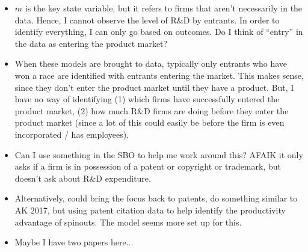 \documentclass[12pt,english]{article}
\theoremstyle{remark}
\begin{document}
\begin{itemize}
	\item $m$ is the key state variable, but it refers to firms that aren't necessarily in the data. Hence, I cannot observe the level of R\&D by entrants. In order to identify everything, I can only go based on outcomes. Do I think of ``entry'' in the data as entering the product market? 
	\item When these models are brought to data, typically only entrants who have won a race are identified with entrants entering the market. This makes sense, since they don't enter the product market until they have a product. But, I have no way of identifying (1) which firms have successfully entered the product market, (2) how much R\&D firms are doing before they enter the product market (since a lot of this could easily be before the firm is even incorporated / has employees). 
	\item Can I use something in the SBO to help me work around this? AFAIK it only asks if a firm is in possession of a patent or copyright or trademark, but doesn't ask about R\&D expenditure.
	\item Alternatively, could bring the focus back to patents, do something similar to AK 2017, but using patent citation data to help identify the productivity advantage of spinouts. The model seems more set up for this.
	\item Maybe I have two papers here...
\end{itemize}
\end{document}
